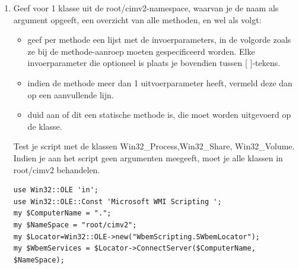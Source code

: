 \documentclass[11pt,a4paper]{report}
\begin{document}
\begin{enumerate}[resume]
\begin{lstlisting}
my $ComputerName = ".";
my $NameSpace = "root/cimv2";
my $Locator=Win32::OLE->new("WbemScripting.SWbemLocator");
my $WbemServices = $Locator->ConnectServer($ComputerName, $NameSpace);

#Steeds alle qualifiers ophalen 
my @Classes = @ARGV ? map {$WbemServices->Get($_,wbemFlagUseAmendedQualifiers)} @ARGV
: in $WbemServices->ExecQuery("select * from meta_class","WQL",wbemFlagUseAmendedQualifiers);

foreach my $Class (@Classes){
	my $Methods = $Class->{Methods_};
	
	foreach my $Method (in $Methods) {
			if ($Method->Qualifiers_->Item("ValueMap") && $Method->Qualifiers_->Item("Values")) {
			@ReturnValues{@{$Method->Qualifiers_->Item("ValueMap")->{Value}}}
			=@{$Method->Qualifiers_->Item("Values")->{Value}};
			printf "\n%s -- %s (ValueMap)",$Class->{Path_}->{Relpath},$Method->{Name};
			foreach $key (sort {$a <=> $b} keys %ReturnValues) { 
				printf "\n\t%s: %s",$key,$ReturnValues{$key};
			}
		}
		
			if (!$Method->Qualifiers_->Item("ValueMap") && $Method->Qualifiers_->Item("Values")) {
			@ReturnValues=@{$Method->Qualifiers_->Item("Values")->{Value}};
			printf "\n%s -- %s (Values)",$Class->{Path_}->{Relpath},$Method->{Name};     
			my $i=0;
			foreach (sort {$a <=> $b} @ReturnValues) {
				printf "\n\t%d: %s",$i++,$_;
			}
		}	
	}
}
	\end{lstlisting}
	\item Geef voor 1 klasse uit de root/cimv2-namespace, waarvan je de naam als argument opgeeft, een overzicht van alle methoden, en wel als volgt:
	\begin{itemize}
		\item geef per methode een lijst met de invoerparameters, in de volgorde zoals ze bij de methode-aanroep moeten gespecificeerd worden. Elke invoerparameter die optioneel is plaats je bovendien tussen [ ]-tekens.
		\item indien de methode meer dan 1 uitvoerparameter heeft, vermeld deze dan op een aanvullende lijn.
		\item duid aan of dit een statische methode is, die moet worden uitgevoerd op de klasse.
	\end{itemize}
	Test je script met de klassen Win32\_Process,Win32\_Share, Win32\_Volume. Indien je aan het script geen argumenten meegeeft, moet je alle klassen in root/cimv2 behandelen.
	\begin{lstlisting}
use Win32::OLE 'in';
use Win32::OLE::Const 'Microsoft WMI Scripting ';
my $ComputerName = ".";
my $NameSpace = "root/cimv2";
my $Locator=Win32::OLE->new("WbemScripting.SWbemLocator");
my $WbemServices = $Locator->ConnectServer($ComputerName, $NameSpace);


\end{lstlisting}
\end{enumerate}
\end{document}

